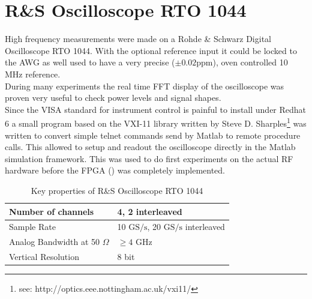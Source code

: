 \section{R\&S Oscilloscope RTO 1044}
\label{sec:comp_osci}
High frequency measurements were made on a Rohde \& Schwarz Digital
Oscilloscope RTO 1044. With the optional reference input it could be locked
to the \gls{AWG} as well used to have a very precise ($\pm 0.02 \text{ppm}$),
oven controlled 10 MHz reference. \\

During many experiments the real time \gls{FFT} display of the oscilloscope was
proven very useful to check power levels and signal shapes. \\

Since the VISA standard for instrument control is painful to install under
Redhat 6 a small program based on the VXI-11 library written by
Steve D. Sharples\footnote{see: http://optics.eee.nottingham.ac.uk/vxi11/}
was written to convert simple telnet commands send by Matlab
to remote procedure calls. This allowed to setup and readout the oscilloscope
directly in the Matlab simulation framework. This was used to do first experiments
on the actual \gls{RF} hardware before the \gls{FPGA} () was
completely implemented. \\

\begin{table}[h]
  \centering
  \begin{tabular}{|l|l|}
    \hline
    Number of channels & 4, 2 interleaved \\ \hline
    Sample Rate & 10 $\text{GS}/\text{s}$, 20 $\text{GS}/\text{s}$ interleaved \\ \hline
    Analog Bandwidth at 50 $\Omega$ & $\geq 4$ GHz \\ \hline
    Vertical Resolution & 8 bit \\ \hline
  \end{tabular}
  \caption{Key properties of R\&S Oscilloscope RTO 1044}
  \label{tab:awg}
\end{table}

